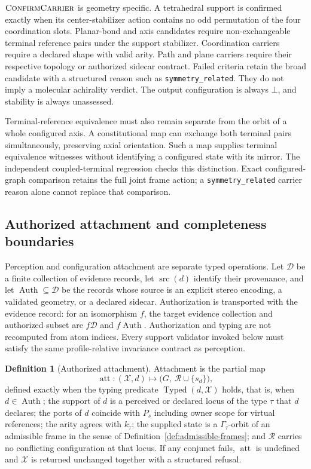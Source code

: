 \documentclass[pdflatex,sn-mathphys-num,referee,lineno]{sn-jnl}
\newcommand{\code}[1]{\texttt{#1}}
\theoremstyle{plain}
\theoremstyle{remark}
\theoremstyle{definition}
\newtheorem{definition}{Definition}
\begin{document}
\(\Call{ConfirmCarrier}{}\) is geometry specific.  A tetrahedral support is
confirmed exactly when its center-stabilizer action contains no odd
permutation of the four coordination slots.  Planar-bond and axis candidates
require non-exchangeable terminal reference pairs under the support
stabilizer.  Coordination carriers require a declared shape with valid arity.
Path and plane carriers require their respective topology or authorized
sidecar contract.  Failed criteria retain the broad candidate with a structured
reason such as \code{symmetry\_related}.  They do not imply a molecular
achirality verdict.  The output configuration is always \(\bot\), and stability
is always unassessed.

Terminal-reference equivalence must also remain separate from the orbit of a
whole configured axis. A constitutional map can exchange both terminal pairs
simultaneously, preserving axial orientation. Such a map supplies terminal
equivalence witnesses without identifying a configured state with its mirror.
The independent coupled-terminal regression checks this distinction. Exact
configured-graph comparison retains the full joint frame action; a
\code{symmetry\_related} carrier reason alone cannot replace that comparison.

\subsection{Authorized attachment and completeness boundaries}
\label{sec:attachment}

Perception and configuration attachment are separate typed operations.
Let \(\mathcal D\) be a finite collection of evidence records, let
\(\operatorname{src}(d)\) identify their provenance, and let
\(\operatorname{Auth}\subseteq\mathcal D\) be the records whose source is an
explicit stereo encoding, a validated geometry, or a declared sidecar.
Authorization is transported with the evidence record: for an isomorphism
\(f\), the target evidence collection and authorized subset are
\(f\mathcal D\) and \(f\operatorname{Auth}\). Authorization and typing
are not recomputed from atom indices. Every support validator invoked below
must satisfy the same profile-relative invariance contract as perception.

\begin{definition}[Authorized attachment]
\label{def:attachment}
Attachment is the partial map
\[
  \operatorname{att}\colon(\mathcal X,d)\longmapsto
  \bigl(G,\ \mathcal R\cup\{s_d\}\bigr),
\]
defined exactly when the typing predicate \(\operatorname{Typed}(d,\mathcal
X)\) holds, that is, when
\(d\in\operatorname{Auth}\); the support of \(d\) is a perceived or declared
locus of the type \(\tau\) that \(d\) declares; the ports of \(d\) coincide with
\(P_s\) including owner scope for virtual references; the arity agrees with
\(k_\tau\); the supplied state is a \(\Gamma_\tau\)-orbit of an admissible frame
in the sense of Definition~\ref{def:admissible-frames}; and \(\mathcal R\)
carries no conflicting configuration at that locus.  If any conjunct fails,
\(\operatorname{att}\) is undefined and \(\mathcal X\) is returned unchanged
together with a structured refusal.
\end{definition}
\end{document}
